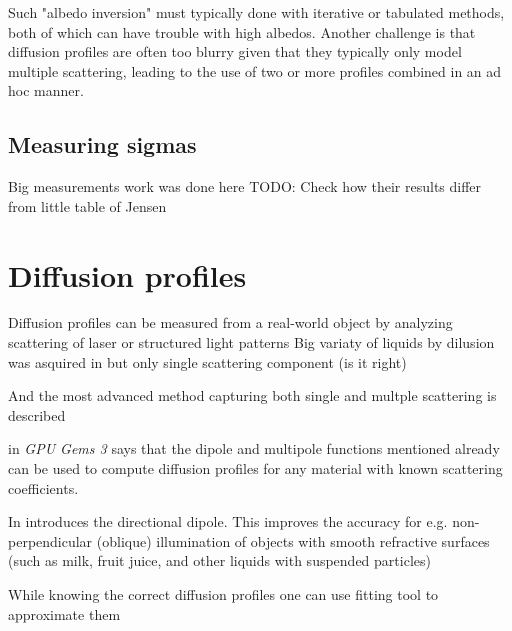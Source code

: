 Such "albedo inversion" must typically done with iterative or tabulated methods,
both of which can have trouble with high albedos. Another challenge is that
diffusion profiles are often too blurry given that they typically only model
multiple scattering, leading to the use of two or more profiles combined in an
ad hoc manner.


\subsection{Measuring sigmas}
Big measurements work was done here \cite{Gkioulekas:2013:IVR:2508363.2508377}
TODO: Check how their results differ from little table of Jensen
\cite{Jensen:2001:PMS:383259.383319}


\section{Diffusion profiles}
\begin{itemize}
    \item{Diffusion profiles can be measured from a real-world object by
    analyzing scattering of laser \cite{Jensen:2001:PMS:383259.383319} or
    structured light patterns \cite{tariq_efficient_2006-1} Big variaty of
    liquids by dilusion was asquired in
    \cite{Narasimhan:2006:ASP:1141911.1141986} but only single scattering
    component (is it right)
    \item{And the most advanced method capturing both single and multple
    scattering is described \cite{Gkioulekas:2013:IVR:2508363.2508377}}}
    \item{\cite{Nguyen:2007:GG:1407436} in \textit{GPU Gems 3} says that the
    dipole and multipole functions mentioned already can be used to compute
    diffusion profiles for any material with known scattering coefficients.
    \item{In \cite{Frisvad:2014:DDM:2702692.2682629} introduces the directional
    dipole}. This improves the accuracy for e.g. non-perpendicular (oblique)
    illumination of objects with smooth refractive surfaces (such as milk, fruit
    juice, and other liquids with suspended particles) }
    \item{While knowing the correct diffusion profiles one can use fitting tool
    to approximate them \cite{Nguyen:2007:GG:1407436}}
\end{itemize}

